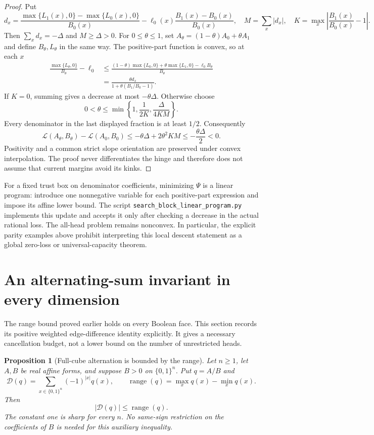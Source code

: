 \documentclass[11pt]{article}
\newtheorem{proposition}{Proposition}
\begin{document}
\begin{proof}
Put
\[
 d_x=\frac{\max\{L_1(x),0\}-\max\{L_0(x),0\}}{B_0(x)}
       -\ell_0(x)\frac{B_1(x)-B_0(x)}{B_0(x)},\quad
 M=\sum_x|d_x|,\quad
 K=\max_x\left|\frac{B_1(x)}{B_0(x)}-1\right|.
\]
Then $\sum_xd_x=-\Delta$ and $M\geq\Delta>0$.
For $0\leq\theta\leq1$, set $A_\theta=(1-\theta)A_0+\theta A_1$
and define $B_\theta,L_\theta$ in the same way. The positive-part
function is convex, so at each $x$
\[
 \begin{split}
 \frac{\max\{L_\theta,0\}}{B_\theta}-\ell_0
 &\leq\frac{(1-\theta)\max\{L_0,0\}
                 +\theta\max\{L_1,0\}-\ell_0B_\theta}{B_\theta}\\
 &=\frac{\theta d_x}{1+\theta(B_1/B_0-1)}.
 \end{split}
\]
If $K=0$, summing gives a decrease at most $-\theta\Delta$.
Otherwise choose
\[
 0<\theta\leq\min\left\{1,\frac1{2K},\frac{\Delta}{4KM}\right\}.
\]
Every denominator in the last displayed fraction is at least $1/2$.
Consequently
\[
 \mathcal L(A_\theta,B_\theta)-\mathcal L(A_0,B_0)
 \leq-\theta\Delta+2\theta^2KM
 \leq-\frac{\theta\Delta}{2}<0.
\]
Positivity and a common strict slope orientation are preserved under
convex interpolation. The proof never differentiates the hinge and
therefore does not assume that current margins avoid its kinks.
\end{proof}

For a fixed trust box on denominator coefficients, minimizing $\Psi$
is a linear program: introduce one nonnegative variable for each
positive-part expression and impose its affine lower bound. The script
\texttt{search\_block\_linear\_program.py} implements this update and
accepts it only after checking a decrease in the actual rational loss.
The all-head problem remains nonconvex. In particular, the explicit
parity examples above prohibit interpreting this local descent statement
as a global zero-loss or universal-capacity theorem.


\section{An alternating-sum invariant in every dimension}

The range bound proved earlier holds on every Boolean face.
This section records its positive weighted edge-difference identity
explicitly. It gives a necessary cancellation budget, not a lower bound
on the number of unrestricted heads.

\begin{proposition}[Full-cube alternation is bounded by the range]
Let $n\geq1$, let $A,B$ be real affine forms, and suppose $B>0$ on
$\{0,1\}^n$. Put $q=A/B$ and
\[
 \mathcal D(q)=\sum_{x\in\{0,1\}^n}(-1)^{|x|}q(x),\qquad
 \operatorname{range}(q)=\max_xq(x)-\min_xq(x).
\]
Then
\[
 |\mathcal D(q)|\leq\operatorname{range}(q).
\]
The constant one is sharp for every $n$. No same-sign restriction on the
coefficients of $B$ is needed for this auxiliary inequality.
\end{proposition}
\end{document}
